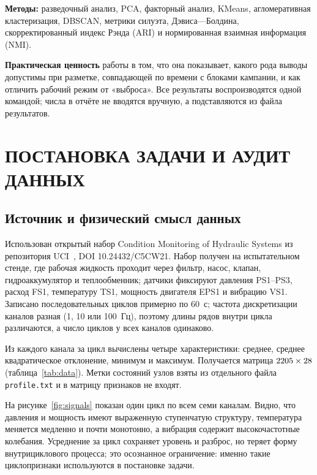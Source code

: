 \documentclass[14pt,a4paper]{extarticle}
\begin{document}
\textbf{Методы:} разведочный анализ, PCA, факторный анализ, KMeans,
агломеративная кластеризация, DBSCAN, метрики силуэта, Дэвиса---Болдина,
скорректированный индекс Рэнда (ARI) и нормированная взаимная информация
(NMI).

\textbf{Практическая ценность} работы в том, что она показывает, какого рода
выводы допустимы при разметке, совпадающей по времени с блоками кампании, и
как отличить рабочий режим от «выброса». Все результаты воспроизводятся
одной командой; числа в отчёте не вводятся вручную, а подставляются из
файла результатов.

\section{ПОСТАНОВКА ЗАДАЧИ И АУДИТ ДАННЫХ}

\subsection{Источник и физический смысл данных}

Использован открытый набор Condition Monitoring of Hydraulic Systems из
репозитория UCI~\cite{uci}, DOI 10.24432/C5CW21. Набор получен на
испытательном стенде, где рабочая жидкость проходит через фильтр, насос,
клапан, гидроаккумулятор и теплообменник; датчики фиксируют давления PS1--PS3,
расход FS1, температуру TS1, мощность двигателя EPS1 и вибрацию VS1.
Записано \DataCycles{} последовательных циклов примерно по 60~с; частота
дискретизации каналов разная (1, 10 или 100~Гц), поэтому длины рядов внутри
цикла различаются, а число циклов у всех каналов одинаково.

Из каждого канала за цикл вычислены четыре характеристики: среднее, среднее
квадратическое отклонение, минимум и максимум. Получается матрица
$2205 \times 28$ (таблица~\ref{tab:data}). Метки
состояний узлов взяты из отдельного файла \texttt{profile.txt} и в матрицу
признаков не входят.

На рисунке~\ref{fig:signals} показан один цикл по всем семи каналам. Видно,
что давления и мощность имеют выраженную ступенчатую структуру, температура
меняется медленно и почти монотонно, а вибрация содержит высокочастотные
колебания. Усреднение за цикл сохраняет уровень и разброс, но теряет форму
внутрициклового процесса; это осознанное ограничение: именно такие
циклопризнаки используются в постановке задачи.
\end{document}

